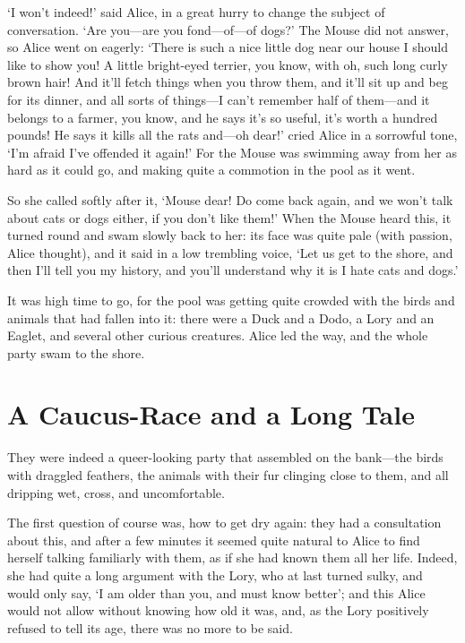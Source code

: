 \documentclass[12pt,openany]{memoir}
\begin{document}
`I won't indeed!' said Alice, in a great hurry to change the subject of conversation. `Are you---are you fond---of---of dogs?' The Mouse did not answer, so Alice went on eagerly: `There is such a nice little dog near our house I should like to show you! A little bright-eyed terrier, you know, with oh, such long curly brown hair! And it'll fetch things when you throw them, and it'll sit up and beg for its dinner, and all sorts of things---I can't remember half of them---and it belongs to a farmer, you know, and he says it's so useful, it's worth a hundred pounds! He says it kills all the rats and---oh dear!' cried Alice in a sorrowful tone, `I'm afraid I've offended it again!' For the Mouse was swimming away from her as hard as it could go, and making quite a commotion in the pool as it went.

So she called softly after it, `Mouse dear! Do come back again, and we won't talk about cats or dogs either, if you don't like them!' When the Mouse heard this, it turned round and swam slowly back to her: its face was quite pale (with passion, Alice thought), and it said in a low trembling voice, `Let us get to the shore, and then I'll tell you my history, and you'll understand why it is I hate cats and dogs.'

It was high time to go, for the pool was getting quite crowded with the birds and animals that had fallen into it: there were a Duck and a Dodo, a Lory and an Eaglet, and several other curious creatures. Alice led the way, and the whole party swam to the shore.


\chapter{A Caucus-Race and a Long Tale}

They were indeed a queer-looking party that assembled on the bank---the birds with draggled feathers, the animals with their fur clinging close to them, and all dripping wet, cross, and uncomfortable.

The first question of course was, how to get dry again: they had a consultation about this, and after a few minutes it seemed quite natural to Alice to find herself talking familiarly with them, as if she had known them all her life. Indeed, she had quite a long argument with the Lory, who at last turned sulky, and would only say, `I am older than you, and must know better'; and this Alice would not allow without knowing how old it was, and, as the Lory positively refused to tell its age, there was no more to be said.
\end{document}
